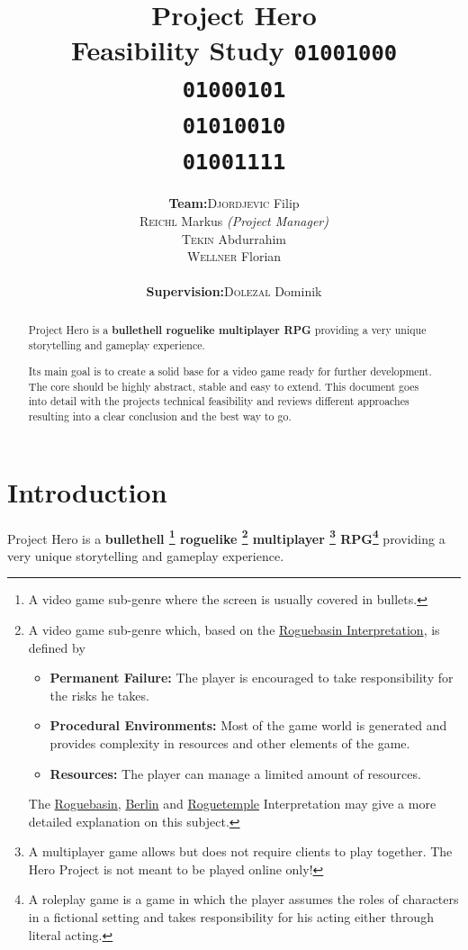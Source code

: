 \documentclass[11pt]{article}
\title{
  \textbf{Project Hero}\\
  \large{Feasibility Study}
  \linebreak
  \linebreak
  \small{\texttt{01001000\\01000101\\01010010\\01001111}}
}
\author{
  \begin{tabular}{rl}
    \textbf{Team:}
    & \textsc{Djordjevic} Filip\\
    & \textsc{Reichl} Markus \small{\textit{(Project Manager)}}\\
    & \textsc{Tekin} Abdurrahim\\
    & \textsc{Wellner} Florian\\
    \\
    \textbf{Supervision:}
    & \textsc{Dolezal} Dominik
  \end{tabular}
}
\begin{document}
\begin{titlepage}
  \clearpage
  \maketitle
  \thispagestyle{empty}
  
  \begin{abstract}
    \begin{flushleft}
      Project Hero is a \textbf{bullethell roguelike multiplayer RPG} providing a very unique storytelling and gameplay experience.
      
      Its main goal is to create a solid base for a video game ready for further development. The core should be highly abstract, stable and easy to extend.
      \linebreak
      \linebreak
      This document goes into detail with the projects technical feasibility and reviews different approaches resulting into a clear conclusion and the best way to go.
     \end{flushleft}
  \end{abstract}
\end{titlepage}

\tableofcontents

\newpage

\section{Introduction}
Project Hero is a \textbf{
  bullethell
  \footnote{A video game sub-genre where the screen is usually covered in bullets.}
  roguelike
  \footnote{A video game sub-genre which, based on the \href{http://roguebasin.com/roguelike-definition}{Roguebasin Interpretation}, is defined by 
    \begin{itemize}
      \item \textbf{Permanent Failure:} The player is encouraged to take responsibility for the risks he takes.
      \item \textbf{Procedural Environments:} Most of the game world is generated and provides complexity in resources and other elements of the game.
      \item \textbf{Resources:} The player can manage a limited amount of resources.
    \end{itemize}
    The \href{http://roguebasin.com/roguelike-definition}{Roguebasin}, \href{http://roguebasin.com/index.php?title=Berlin_Interpretation}{Berlin} and \href{http://roguetemple.com/roguelike-definition}{Roguetemple} Interpretation may give a more detailed explanation on this subject.
  }
  multiplayer
  \footnote{A multiplayer game allows but does not require clients to play together. The Hero Project is not meant to be played online only!}
  RPG\footnote{A roleplay game is a game in which the player assumes the roles of characters in a fictional setting and takes responsibility for his acting either through literal acting.}
} providing a very unique storytelling and gameplay experience.
\end{document}
